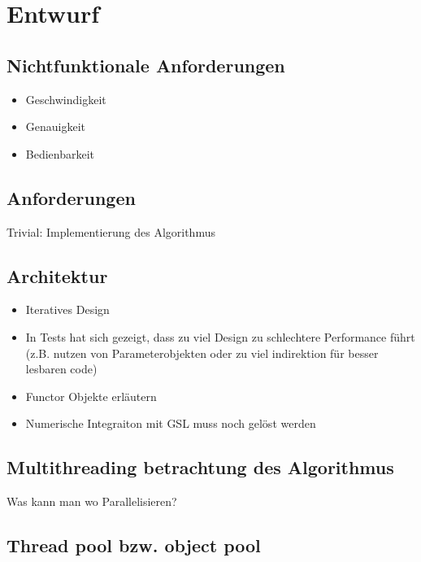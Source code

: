 \chapter{Entwurf}

\section{Nichtfunktionale Anforderungen}

\begin{itemize}
    \item Geschwindigkeit
    \item Genauigkeit
    \item Bedienbarkeit
\end{itemize}

\section{Anforderungen}

Trivial: Implementierung des Algorithmus

\section{Architektur}

\begin{itemize}
    \item Iteratives Design 
    \item In Tests hat sich gezeigt, dass zu viel Design zu schlechtere Performance führt (z.B. nutzen von Parameterobjekten oder zu viel indirektion für besser lesbaren code)
    \item Functor Objekte erläutern
    \item Numerische Integraiton mit GSL muss noch gelöst werden
\end{itemize}

\section{Multithreading betrachtung des Algorithmus}

Was kann man wo Parallelisieren?

\section{Thread pool bzw. object pool}

